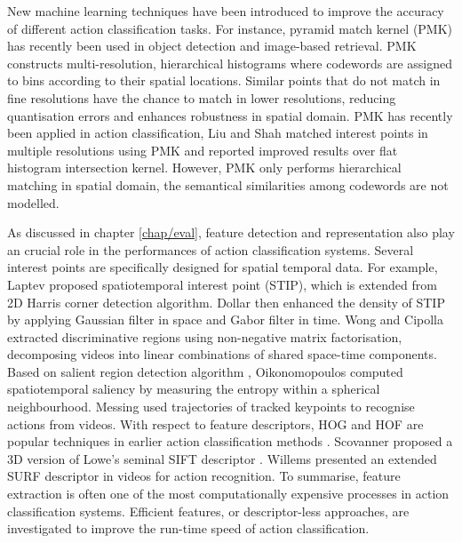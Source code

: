New machine learning techniques have been introduced to improve the accuracy of different action classification tasks.  
For instance, pyramid match kernel (PMK) \cite{Grauman2005} has recently been used in object detection and image-based retrieval. PMK constructs multi-resolution, hierarchical histograms where codewords are assigned to bins according to their spatial locations. Similar points that do not match in fine resolutions have the chance to match in lower resolutions, reducing quantisation errors and enhances robustness in spatial domain. PMK has recently been applied in action classification, Liu and Shah \cite{Liu2008} matched interest points in multiple resolutions using PMK and reported improved results over flat histogram intersection kernel. 
However, PMK only performs hierarchical matching in spatial domain, the semantical similarities among codewords are not modelled.  

As discussed in chapter \ref{chap/eval}, feature detection and representation also play an crucial role in the performances of action classification systems. Several interest points are specifically designed for spatial temporal data. For example, Laptev \cite{Laptev2005} proposed spatiotemporal interest point (STIP), which is extended from 2D Harris corner detection algorithm. Dollar \etal \cite{Dollar2005} then enhanced the density of STIP by applying Gaussian filter in space and Gabor filter in time.  
Wong and Cipolla \cite{Wong2007a} extracted discriminative regions using non-negative matrix factorisation, decomposing videos into linear combinations of shared space-time components.
Based on salient region detection algorithm \cite{Mikolajczyk2004}, Oikonomopoulos \etal \cite{Oikonomopoulos2005} computed spatiotemporal saliency by measuring the entropy within a spherical neighbourhood. Messing \etal \cite{Messing2009} used trajectories of tracked keypoints to recognise actions from videos. 
With respect to feature descriptors, HOG and HOF are popular techniques in earlier action classification methods \cite{Dollar2005, Niebles2008, Schuldt2004}. Scovanner \etal \cite{Scovanner2007} proposed a 3D version of Lowe's seminal SIFT descriptor \cite{Lowe2004}. Willems \etal \cite{Willems2009} presented an extended SURF descriptor in videos for action recognition.  
To summarise, feature extraction is often one of the most computationally expensive processes in action classification systems. Efficient features, or descriptor-less approaches, are investigated to improve the run-time speed of action classification.  

